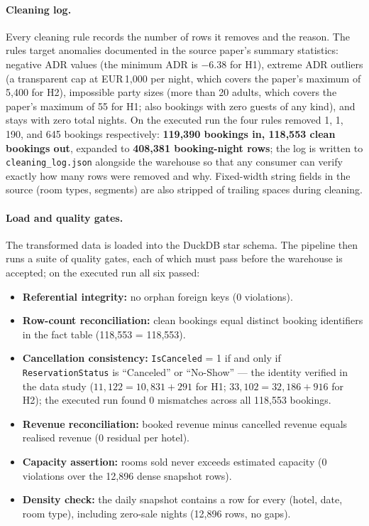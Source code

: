 \paragraph{Cleaning log.}
Every cleaning rule records the number of rows it removes and the reason. The rules target anomalies documented in the source paper's summary statistics: negative ADR values (the minimum ADR is $-6.38$ for H1), extreme ADR outliers (a transparent cap at EUR\,1{,}000 per night, which covers the paper's maximum of 5{,}400 for H2), impossible party sizes (more than 20 adults, which covers the paper's maximum of 55 for H1; also bookings with zero guests of any kind), and stays with zero total nights. On the executed run the four rules removed 1, 1, 190, and 645 bookings respectively: \textbf{119{,}390 bookings in, 118{,}553 clean bookings out}, expanded to \textbf{408{,}381 booking-night rows}; the log is written to \texttt{cleaning\_log.json} alongside the warehouse so that any consumer can verify exactly how many rows were removed and why. Fixed-width string fields in the source (room types, segments) are also stripped of trailing spaces during cleaning.

\paragraph{Load and quality gates.}
The transformed data is loaded into the DuckDB star schema. The pipeline then runs a suite of quality gates, each of which must pass before the warehouse is accepted; on the executed run all six passed:

\begin{itemize}
  \item \textbf{Referential integrity:} no orphan foreign keys (0 violations).
  \item \textbf{Row-count reconciliation:} clean bookings equal distinct booking identifiers in the fact table (118{,}553 = 118{,}553).
  \item \textbf{Cancellation consistency:} \texttt{IsCanceled} = 1 if and only if \texttt{ReservationStatus} is ``Canceled'' or ``No-Show'' --- the identity verified in the data study ($11{,}122 = 10{,}831 + 291$ for H1; $33{,}102 = 32{,}186 + 916$ for H2); the executed run found 0 mismatches across all 118{,}553 bookings.
  \item \textbf{Revenue reconciliation:} booked revenue minus cancelled revenue equals realised revenue (0 residual per hotel).
  \item \textbf{Capacity assertion:} rooms sold never exceeds estimated capacity (0 violations over the 12{,}896 dense snapshot rows).
  \item \textbf{Density check:} the daily snapshot contains a row for every (hotel, date, room type), including zero-sale nights (12{,}896 rows, no gaps).
\end{itemize}

